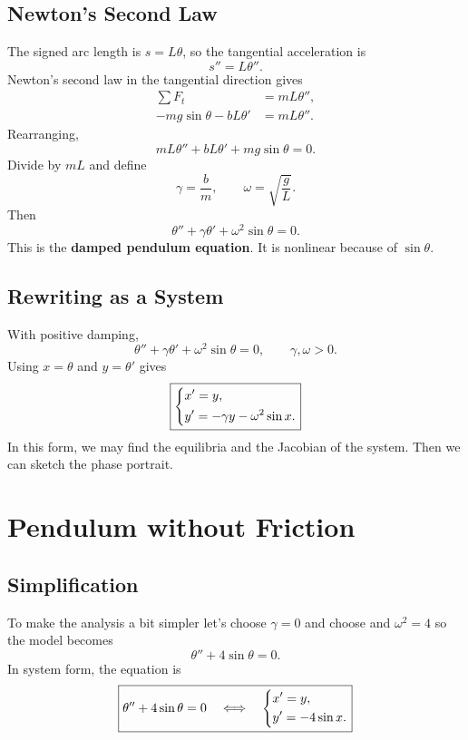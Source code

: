 \documentclass[11pt,letterpaper]{article}
\begin{document}
\subsection{Newton's Second Law}

The signed arc length is $s=L\theta$, so the
tangential acceleration is
\[
s''=L\theta''.
\]
Newton's second law in the tangential direction gives
\begin{align*}
\sum F_t&=mL\theta'',\\
-mg\sin\theta-bL\theta'&=mL\theta''.
\end{align*}
Rearranging,
\[
mL\theta''+bL\theta'+mg\sin\theta=0.
\]
Divide by $mL$ and define
\[
\gamma=\frac{b}{m},
\qquad
\omega=\sqrt{\frac{g}{L}}.
\]
Then
\[
\boxed{
\theta''+\gamma\theta'+\omega^2\sin\theta=0.
}
\]
This is the \textbf{damped pendulum equation}.
It is nonlinear because of $\sin\theta$.


\subsection{Rewriting as a System}

With positive damping,
\[
\theta''+\gamma\theta'+\omega^2\sin\theta=0,
\qquad \gamma,\omega>0.
\]
Using $x=\theta$ and $y=\theta'$ gives
\[
\boxed{
\begin{dcases}
x'=y,\\
y'=-\gamma y-\omega^2\sin x.
\end{dcases}
}
\]
In this form, we may find the equilibria and the Jacobian of the system. Then we can sketch the phase portrait.

\section{Pendulum without Friction}

\subsection{Simplification}
To make the analysis a bit simpler let's choose $\gamma=0$ and choose and $\omega^2=4$ so the model becomes 
\[
\theta''+4\sin\theta=0.
\]
In system form, the equation is
\[
\boxed{
\theta''+4\sin\theta=0
\quad\Longleftrightarrow\quad
\begin{dcases}
x'=y,\\
y'=-4\sin x.
\end{dcases}
}
\]
\end{document}
